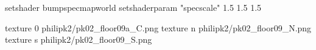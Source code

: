 setshader bumpspecmapworld
setshaderparam "specscale" 1.5 1.5 1.5

texture 0 philipk2/pk02_floor09a_C.png
texture n philipk2/pk02_floor09_N.png
texture s philipk2/pk02_floor09_S.png

